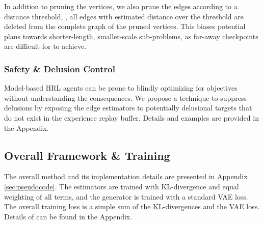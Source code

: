 In addition to pruning the vertices, we also prune the edges according to a distance threshold, \ie{}, all edges with estimated distance over the threshold are deleted from the complete graph of the pruned vertices. This biases potential plans towards shorter-length, smaller-scale sub-problems, as far-away checkpoints are difficult for \red{$\pi$} to achieve.

\subsubsection{Safety \& Delusion Control}

Model-based HRL agents can be prone to blindly optimizing for objectives without understanding the consequences. We propose a technique to suppress delusions by exposing the edge estimators to  potentially delusional targets that do not exist in the experience replay buffer. Details and examples are provided in the Appendix.

\subsection{Overall Framework \& Training}
The overall method and its implementation details are presented in Appendix \ref{sec:pseudocode}. The estimators are trained with KL-divergence and equal weighting of all terms, and the generator is trained with a standard VAE loss. The overall training loss is a simple sum of the KL-divergences and the VAE loss. Details of \agentshort{} can be found in the Appendix.




